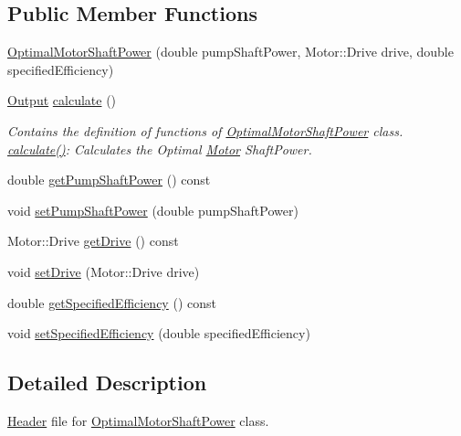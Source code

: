 \subsection*{Public Member Functions}
\begin{DoxyCompactItemize}
\item 
\hyperlink{class_optimal_motor_shaft_power_ad830e1f8a7931e3c6bec5f8828d57e83}{Optimal\+Motor\+Shaft\+Power} (double pump\+Shaft\+Power, Motor\+::\+Drive drive, double specified\+Efficiency)
\item 
\hyperlink{struct_optimal_motor_shaft_power_1_1_output}{Output} \hyperlink{class_optimal_motor_shaft_power_a486edea429b828e5d989fb32034f4059}{calculate} ()
\begin{DoxyCompactList}\small\item\em Contains the definition of functions of \hyperlink{class_optimal_motor_shaft_power}{Optimal\+Motor\+Shaft\+Power} class. \hyperlink{class_optimal_motor_shaft_power_a486edea429b828e5d989fb32034f4059}{calculate()}\+: Calculates the Optimal \hyperlink{struct_motor}{Motor} Shaft\+Power. \end{DoxyCompactList}\item 
double \hyperlink{class_optimal_motor_shaft_power_aca7bb632c659ecf2ebf3cb9fdb23626f}{get\+Pump\+Shaft\+Power} () const
\item 
void \hyperlink{class_optimal_motor_shaft_power_ab2d80927fbaa62705359700b2a8f2f26}{set\+Pump\+Shaft\+Power} (double pump\+Shaft\+Power)
\item 
Motor\+::\+Drive \hyperlink{class_optimal_motor_shaft_power_a3cc369285d8b3582fcd8c44e5a1c37c8}{get\+Drive} () const
\item 
void \hyperlink{class_optimal_motor_shaft_power_a8f3288a69848c61f4e8e2b14da549d16}{set\+Drive} (Motor\+::\+Drive drive)
\item 
double \hyperlink{class_optimal_motor_shaft_power_a89c2038dae30ef58245e810187c2a6c4}{get\+Specified\+Efficiency} () const
\item 
void \hyperlink{class_optimal_motor_shaft_power_a92f7da022e380abbd8cfd308e8aa5e58}{set\+Specified\+Efficiency} (double specified\+Efficiency)
\end{DoxyCompactItemize}


\subsection{Detailed Description}
\hyperlink{class_header}{Header} file for \hyperlink{class_optimal_motor_shaft_power}{Optimal\+Motor\+Shaft\+Power} class. 

